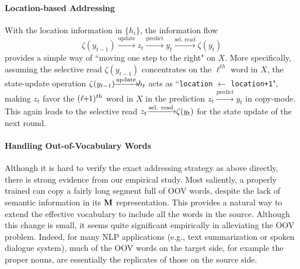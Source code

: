 \paragraph{Location-based Addressing} 
With the location information in $\{ h_i \} $, the information flow %
\[
\zeta(y_{t-1}) \xrightarrow{\text{update}}  z_{t} \xrightarrow{\text{predict}} y_{t} \xrightarrow{\text{sel. read}}  \zeta(y_{t}) 
\]
provides a simple way of ``moving one step to the right" on $X$. 
More specifically, assuming the selective read $\zeta(y_{t-1})$ concentrates on the $\ell^{th}$ word in $X$, 
the state-update operation $\zeta(y_{t-1})\hspace{-4pt} \xrightarrow{\text{update}} \hspace{-4pt} h_t $ acts as 
``\texttt{\small location} $\leftarrow$ \texttt{\small location+1}", 
making $z_t$ favor the $(\ell \hspace{-3pt}+\hspace{-3pt}1)^{th}$ word in $X$ in the prediction 
$z_t \xrightarrow{\text{predict}} y_{t}$ in copy-mode. 
This again leads to the selective read  $z_{t} \hspace{-3pt}\xrightarrow{\text{sel. read}} \hspace{-3pt} \zeta(y_{t})$ 
for the state update of the next round.

\paragraph{Handling Out-of-Vocabulary Words}
Although it is hard to verify the exact addressing strategy as above directly, 
there is strong evidence from our empirical study. 
Most saliently, a properly trained \copynet can copy a fairly long segment full of OOV words, 
despite the lack of semantic information in its $\mathbf{M}$ representation. 
This provides a natural way to extend the effective vocabulary to include all the words in the source. 
Although this change is small, it seems quite significant empirically in alleviating the OOV problem. 
Indeed, for many NLP applications (e.g., text summarization or spoken dialogue system),  
much of the OOV words on the target side, for example the proper nouns, 
are essentially the replicates of those on the source side.

